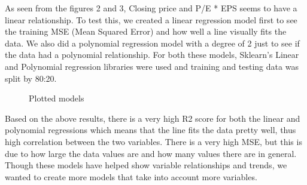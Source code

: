 \documentclass{article}
\begin{document}
As seen from the figures 2 and 3, Closing price and P/E * EPS seems to have a linear relationship. To test this, we created a linear regression model first to see the training MSE (Mean Squared Error) and how well a line visually fits the data. We also did a polynomial regression model with a degree of 2 just to see if the data had a polynomial relationship. For both these models, Sklearn’s Linear and Polynomial regression libraries were used and training and testing data was split by 80:20.

\begin{figure}[H]
    \qquad
    \caption{Plotted models}
    \label{fig:example}
\end{figure}
Based on the above results, there is a very high R2 score for both the linear and polynomial regressions which means that the line fits the data pretty well, thus high correlation between the two variables. There is a very high MSE, but this is due to how large the data values are and how many values there are in general. Though these models have helped show variable relationships and trends, we wanted to create more models that take into account more variables.
\end{document}
